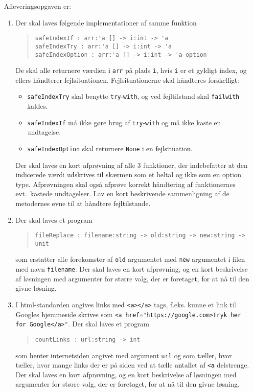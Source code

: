 \documentclass[a4paper,12pt]{article}
\begin{document}
Afleveringsopgaven er:
\begin{enumerate}[label=8i.\arabic*,start=0]
\item Der skal laves følgende implementationer af samme funktion
  \begin{quote}
    \mbox{\lstinline!safeIndexIf : arr:'a [] -> i:int -> 'a!}
    \\\mbox{\lstinline!safeIndexTry : arr:'a [] -> i:int -> 'a!}
    \\\mbox{\lstinline!safeIndexOption : arr:'a [] -> i:int -> 'a option!}
  \end{quote}
  De skal alle returnere værdien i \lstinline!arr! på plads \lstinline!i!, hvis \lstinline!i! er et gyldigt index, og ellers håndterer fejlsituationen.  Fejlsituationerne skal håndteres forskelligt:
  \begin{itemize}
  \item \lstinline!safeIndexTry! skal benytte \lstinline!try!-\lstinline!with!, og ved fejltilstand skal \lstinline!failwith! kaldes. 
  \item \lstinline!safeIndexIf! må ikke gøre brug af \lstinline!try!-\lstinline!with! og må ikke kaste en undtagelse. 
  \item \lstinline!safeIndexOption! skal returnere \lstinline!None! i en fejlsituation. 
  \end{itemize}
   Der skal laves en kort afprøvning af alle 3 funktioner, der indebefatter at den indicerede værdi udskrives til skærmen som et heltal og ikke som en option type. Afprøvningen skal også afprøve korrekt håndtering af funktionernes evt.\ kastede undtagelser.  Lav en kort beskrivende sammenligning af de metodernes evne til at håndtere fejltilstande.
 \item Der skal laves et program
  \begin{quote}
    \mbox{\lstinline!fileReplace : filename:string -> old:string -> new:string -> unit!}
  \end{quote}
  som erstatter alle forekomster af \lstinline!old! argumentet med \lstinline!new! argumentet i filen med navn \lstinline!filename!. Der skal laves en kort afprøvning, og en kort beskrivelse af løsningen med argumenter for større valg, der er foretaget, for at nå til den givne løsning.
\item I html-standarden angives links med \lstinline!<a></a>! tags, f.eks. kunne et link til Googles hjemmeside skrives som \lstinline!<a href="https://google.com>Tryk her for Google</a>"!. Der skal laves et program
  \begin{quote}
    \mbox{\lstinline!countLinks : url:string -> int!}
  \end{quote}
  som henter internetsiden angivet med argument \lstinline!url! og som tæller, hvor tæller, hvor mange links der er på siden ved at tælle antallet af \lstinline!<a! delstrenge. Der skal laves en kort afprøvning, og en kort beskrivelse af løsningen med argumenter for større valg, der er foretaget, for at nå til den givne løsning.
\end{enumerate}
\end{document}
